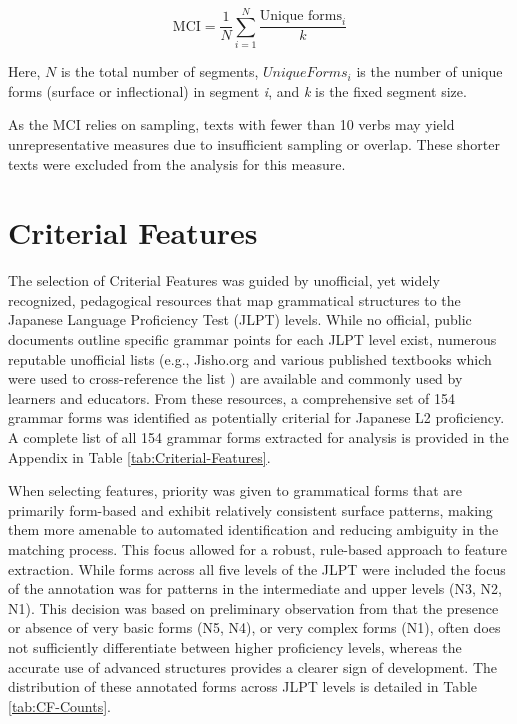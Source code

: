 \begin{equation}
    \text{MCI} = \frac{1}{N}\sum_{i=1}^{N} \frac{\text{Unique forms}_i}{k}
\end{equation}

Here, $N$ is the total number of segments, $Unique Forms_i$ is the number of unique forms (surface or
inflectional) in segment \textit{i}, and \textit{k} is the fixed segment size.

As the MCI relies on sampling, texts with fewer than 10 verbs may yield unrepresentative measures due to
insufficient sampling or overlap. These shorter texts were excluded from the analysis for this measure.

\section{Criterial Features}
The selection of Criterial Features was guided by unofficial, yet widely recognized, pedagogical resources that map
grammatical structures to the Japanese Language Proficiency Test (JLPT) levels. While no official, public documents
outline specific grammar points for each JLPT level exist, numerous reputable unofficial lists (e.g., Jisho.org \citep{jisho.org} and
various published textbooks which were used to cross-reference the list
\citep{nihongo_n5_all_skills,nihongo_n4,nihongo_n3, nihongo_n2,nihongo_n1}) are available and
commonly used by learners and educators. From these resources, a comprehensive set of 154 grammar forms was
identified as potentially criterial for Japanese L2 proficiency. A complete list of all 154 grammar forms extracted
for analysis is provided in the Appendix in Table \ref{tab:Criterial-Features}.

When selecting features, priority was given to grammatical forms that are primarily form-based and exhibit
relatively consistent surface patterns, making them more amenable to automated identification and reducing
ambiguity in the matching process. This focus allowed for a robust, rule-based approach to feature extraction. While
forms across all five levels of the JLPT were included the focus of the annotation was for patterns in the
intermediate and upper levels (N3, N2, N1). This decision was based on preliminary observation from \citet{akef2025}
that the presence or absence of very basic forms (N5, N4), or very complex forms (N1), often does not sufficiently
differentiate between higher
proficiency levels, whereas the accurate use of advanced structures provides a clearer sign of development. The
distribution of these annotated forms across JLPT levels is detailed in Table
\ref{tab:CF-Counts}.

